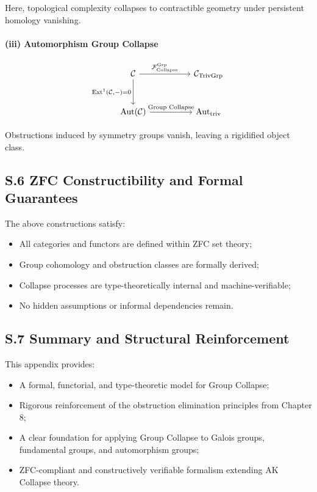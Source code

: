 \documentclass[11pt]{article}
\begin{document}
Here, topological complexity collapses to contractible geometry under persistent homology vanishing.

\paragraph{(iii) Automorphism Group Collapse}

\[
\begin{tikzcd}[column sep=huge, row sep=large]
\mathcal{C} \arrow[r, "{\mathcal{F}_{\mathrm{Collapse}}^{\mathrm{Grp}}}"] \arrow[d, swap, "{\mathrm{Ext}^1(\mathcal{C}, -) = 0}"]
& \mathcal{C}_{\mathrm{TrivGrp}} \\
\mathrm{Aut}(\mathcal{C}) \arrow[r, "{\text{Group Collapse}}"]
& \mathrm{Aut}_{\mathrm{triv}}
\end{tikzcd}
\]

Obstructions induced by symmetry groups vanish, leaving a rigidified object class.


\subsection*{S.6 ZFC Constructibility and Formal Guarantees}

The above constructions satisfy:

\begin{itemize}
    \item All categories and functors are defined within ZFC set theory;
    \item Group cohomology and obstruction classes are formally derived;
    \item Collapse processes are type-theoretically internal and machine-verifiable;
    \item No hidden assumptions or informal dependencies remain.
\end{itemize}

\subsection*{S.7 Summary and Structural Reinforcement}

This appendix provides:

\begin{itemize}
    \item A formal, functorial, and type-theoretic model for Group Collapse;
    \item Rigorous reinforcement of the obstruction elimination principles from Chapter 8;
    \item A clear foundation for applying Group Collapse to Galois groups, fundamental groups, and automorphism groups;
    \item ZFC-compliant and constructively verifiable formalism extending AK Collapse theory.
\end{itemize}
\end{document}
